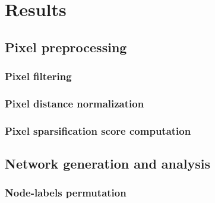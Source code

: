 \graphicspath{{chapters/05_results/images}}
\chapter{Results}


\section{Pixel preprocessing}

\subsection{Pixel filtering}


\subsection{Pixel distance normalization}

\subsection{Pixel sparsification score computation}



\section{Network generation and analysis}

\subsection{Node-labels permutation}


